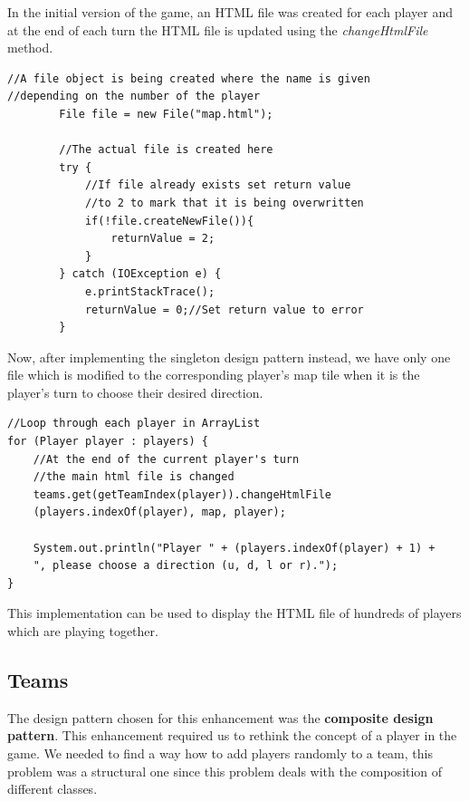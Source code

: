 \documentclass[a4paper,12pt]{extarticle}
\begin{document}
\newpage
\noindent In the initial version of the game, an HTML file was created for each player and at the end of each turn the HTML file is updated using the \textit{changeHtmlFile} method.

\begin{lstlisting}
//A file object is being created where the name is given 
//depending on the number of the player
        File file = new File("map.html");

        //The actual file is created here
        try {
            //If file already exists set return value
            //to 2 to mark that it is being overwritten
            if(!file.createNewFile()){
                returnValue = 2;
            }
        } catch (IOException e) {
            e.printStackTrace();
            returnValue = 0;//Set return value to error
        }
\end{lstlisting}
\vspace{4mm}

\noindent Now, after implementing the singleton design pattern instead, we have only one file which is modified to the corresponding player's map tile when it is the player's turn to choose their desired direction.

\begin{lstlisting}
//Loop through each player in ArrayList
for (Player player : players) {
    //At the end of the current player's turn 
    //the main html file is changed
    teams.get(getTeamIndex(player)).changeHtmlFile
    (players.indexOf(player), map, player);

    System.out.println("Player " + (players.indexOf(player) + 1) +
    ", please choose a direction (u, d, l or r).");
}
\end{lstlisting}

\noindent This implementation can be used to display the HTML file of hundreds of players which are playing together.

\newpage
\subsection{Teams}
The design pattern chosen for this enhancement was the \textbf{composite design pattern}. This enhancement required us to rethink the concept of a player in the game. We needed to find a way how to add players randomly to a team, this problem was a structural one since this problem deals with the composition of different classes.\\
\end{document}
